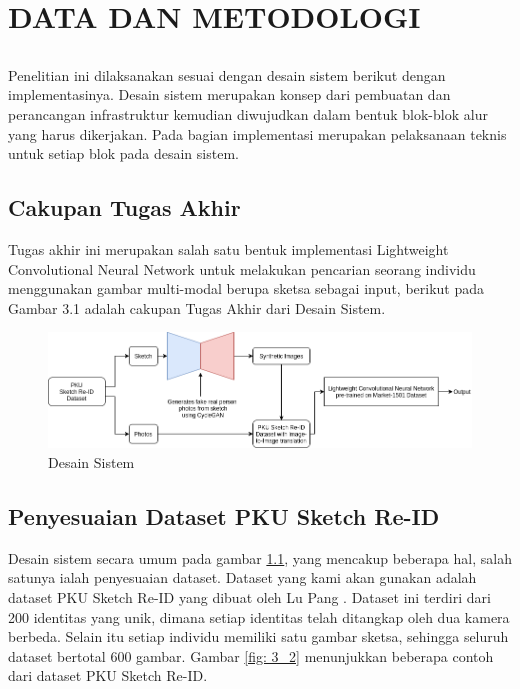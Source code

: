 \chapter{DATA DAN METODOLOGI}
\vspace{1ex}

\section*{}
Penelitian ini dilaksanakan sesuai dengan desain sistem berikut dengan implementasinya. Desain sistem merupakan konsep dari pembuatan dan perancangan infrastruktur kemudian diwujudkan dalam bentuk blok-blok alur yang harus dikerjakan. Pada bagian implementasi merupakan pelaksanaan teknis untuk setiap blok pada desain sistem.
\vspace{1ex}

\section{Cakupan Tugas Akhir}
\vspace{1ex}

Tugas akhir ini merupakan salah satu bentuk implementasi Lightweight Convolutional Neural Network untuk melakukan pencarian seorang individu menggunakan gambar multi-modal berupa sketsa sebagai input, berikut pada Gambar 3.1 adalah cakupan Tugas Akhir dari Desain Sistem.
\begin{figure}  [!htb]
	\includegraphics[scale=0.35]{img/desain_sistem.png}
	\caption{Desain Sistem}
	\label{fig: 3_1}
\end{figure}
\vspace{1ex}

\section{Penyesuaian Dataset PKU Sketch Re-ID}
Desain sistem secara umum pada gambar \ref{fig: 3_1}, yang mencakup beberapa hal, salah satunya ialah penyesuaian dataset. Dataset yang kami akan gunakan adalah dataset PKU Sketch Re-ID yang dibuat oleh Lu Pang \cite{cit:15}. Dataset ini terdiri dari 200 identitas yang unik, dimana setiap identitas telah ditangkap oleh dua kamera berbeda. Selain itu setiap individu memiliki satu gambar sketsa, sehingga seluruh dataset bertotal 600 gambar. Gambar \ref{fig: 3_2} menunjukkan beberapa contoh dari dataset PKU Sketch Re-ID. 

